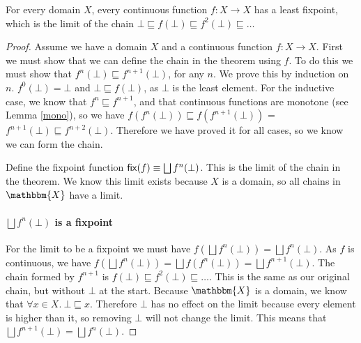 
\begin{thm}
For every domain $X$, every continuous function $f : X \to X$ has a least fixpoint, which is the limit of the chain $\bot \sqsubseteq f(\bot) \sqsubseteq f^2(\bot) \sqsubseteq \dots$
\end{thm}

\begin{proof}
Assume we have a domain $X$ and a continuous function $f: X \to X$. First we must show that we can define the chain in the theorem using $f$. To do this we must show that $f^n(\bot) \sqsubseteq f^{n+1}(\bot)$, for any $n$. We prove this by induction on $n$. $f^0(\bot) = \bot$ and $\bot \sqsubseteq f(\bot)$, as $\bot$ is the least element. For the inductive case, we know that $f^{n} \sqsubseteq f^{n+1}$, and that continuous functions are monotone (see Lemma \ref{mono}), so we have $f(f^{n}(\bot)) \sqsubseteq f(f^{n+1}(\bot))$ = $f^{n+1}(\bot) \sqsubseteq f^{n+2}(\bot)$. Therefore we have proved it for all cases, so we know we can form the chain.

Define the fixpoint function $\operatorname{\mathsf{fix}}(f) \equiv \bigsqcup f^n (\bot)$. This is the limit of the chain in the theorem. We know this limit exists because $X$ is a domain, so all chains in $\mathbbm{X}$ have a limit. %



\paragraph{$\bigsqcup f^n (\bot)$ is a fixpoint}
For the limit to be a fixpoint we must have  $f( \bigsqcup f^n (\bot)) =  \bigsqcup f^n (\bot)$.  As $f$ is continuous, we have $f( \bigsqcup f^n (\bot)) = \bigsqcup f(f^n(\bot)) = \bigsqcup f^{n+1}(\bot)$. The chain formed by $f^{n+1}$ is $f(\bot)  \sqsubseteq f^2(\bot) \sqsubseteq \dots$. This is the same as our original chain, but without $\bot$ at the start. Because $\mathbbm{X}$ is a domain, we know that $\forall x \in X. \ \bot \sqsubseteq x$. Therefore $\bot$ has no effect on the limit because every element is higher than it, so removing $\bot$ will not change the limit. This means that $\bigsqcup f^{n+1} (\bot) = \bigsqcup f^n(\bot)$.


\end{proof}
